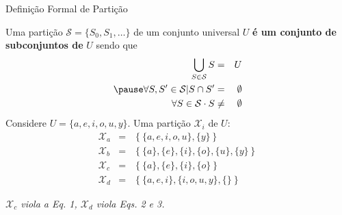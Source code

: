       \begin{frame}{Definição Formal de Partição}
   
         Uma partição $ \mathcal{S} = \{S_0, S_1, \dots\} $ de um conjunto universal $ U $ \textbf{é um conjunto de subconjuntos de} $ U $ sendo que
            \begin{eqnarray}
               \bigcup_{S \in \mathcal{S}} S &=& U \label{eq:part_form_1} \\ \pause
               \forall S, S' \in \mathcal{S} | S \cap S' &=& \emptyset \label{eq:part_form_2} \\
               \forall S \in \mathcal{S} \cdot S &\neq& \emptyset \label{eq:part_form_3}
            \end{eqnarray}
            \pause
            Considere $ U = \{a, e, i, o, u, y\} $. Uma partição $ \mathcal{X}_i $ de $ U $:
            \begin{eqnarray}
            \mathcal{X}_a &=& \left\{\{a, e, i, o, u\}, \{y\}\right\} \label{eq:xa} \\
            \mathcal{X}_b &=& \left\{\{a\}, \{e\}, \{i\}, \{o\}, \{u\}, \{y\}\right\} \label{eq:part_a} \\
            \mathcal{X}_c &=& \left\{\{a\}, \{e\}, \{i\}, \{o\} \right\} \label{eq:part_c} \\
            \mathcal{X}_d &=& \left\{\{a, e, i\}, \{i, o, u, y\}, \{\}\right\} \label{eq:part_d}
            \end{eqnarray}
            
           \textit{$\mathcal{X}_c$ viola a Eq. 1, $\mathcal{X}_d$ viola Eqs. 2 e 3.}
            
      \end{frame}
   
   
   
